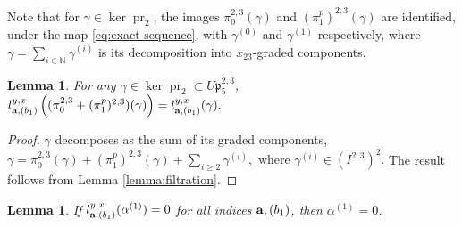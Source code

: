 \documentclass[a4paper,fleqn]{cas-sc}
\newtheorem{lemma}[theorem]{Lemma}
\DeclareMathOperator{\pr}{pr}
\begin{document}
  Note that for $\gamma \in \ker \pr_2$, the images $\pi_0^{2,3}(\gamma)$ and $(\pi_1^p)^{2,3}(\gamma)$ are identified, under the map \eqref{eq:exact sequence}, with $\gamma^{(0)}$ and $\gamma^{(1)}$ respectively, where $\gamma = \sum_{i \in \mathbb{N}} \gamma^{(i)}$ is its decomposition into $x_{23}$-graded components. 

\begin{lemma} \label{lemma: the quotient}
	For any $\gamma\in \ker \pr_{2}\subset U\mathfrak{p}^{2,3}_5 $, %
	$
		l^{y,x}_{{\bf{a}},(b_1)}\left( (\pi^{2,3}_0+(\pi^p_1)^{2,3})(\gamma) \right)=l^{y,x}_{{\bf{a}},(b_1)}(\gamma).
	$
\end{lemma}

\begin{proof}
 $\gamma$ decomposes as the sum of its graded components,
$
    \gamma=\pi^{2,3}_0(\gamma)+(\pi_1^p)^{2,3}(\gamma) +\sum_{i \geq 2} \gamma^{(i)}, \text{ where } \gamma^{(i)}\in (I^{2,3})^2.
$
The result follows from Lemma \ref{lemma:filtration}.
\end{proof}



\begin{lemma} \label{lemma:exact_pair}
If $l^{y,x}_{\bold a,(b_1)}(\alpha^{(1)})=0$ for all indices $\bold a, (b_1)$, then $\alpha^{(1)}=0$.
\end{lemma}
\end{document}
